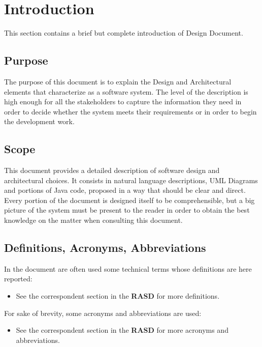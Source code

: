 \section{Introduction}
This section contains a brief but complete introduction of \myTaxiService{} Design Document.

\subsection{Purpose}
The purpose of this document is to explain the Design and Architectural elements that characterize \myTaxiService{} as a software system. The level of the description is high enough for all the stakeholders to capture the information they need in order to decide whether the system meets their requirements or in order to begin the development work.

\subsection{Scope}
This document provides a detailed description of \myTaxiService{} software design and architectural choices.
It consists in natural language descriptions, UML Diagrams and portions of Java code, proposed in a way that should be clear and direct.
Every portion of the document is designed itself to be comprehensible, but a big picture of the system must be present to the reader in order to obtain the best knowledge on the matter when consulting this document.

\subsection{Definitions, Acronyms, Abbreviations}
In the document are often used some technical terms whose definitions are here reported:
\begin{itemize}
	 A software level in a software system.
	 An hardware level in a software system.
	 A digital database whose organization is based on the relational model of data, as proposed by E.F. Codd in 1970.
	 A strict application of MVC principles.
	\item See the correspondent section in the \textbf{RASD} for more definitions.
\end{itemize}
For sake of brevity, some acronyms and abbreviations are used:
\begin{itemize}
	 Design Document.
	 Global Positioning System.
	 Graphic User Interface.
	 Application Programming Interface.
	 Model View Controller.
	 Estimated Time of Arrival.
	\item See the correspondent section in the \textbf{RASD} for more acronyms and abbreviations.
\end{itemize}

